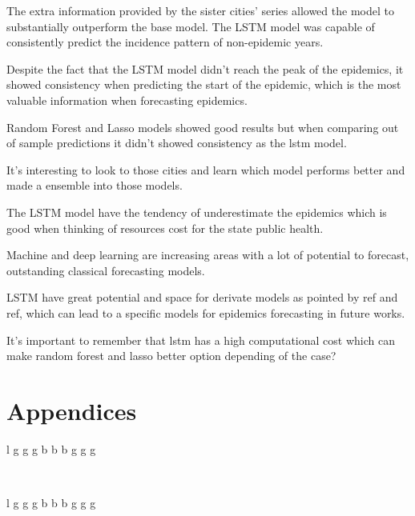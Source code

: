 \documentclass[12pt]{report}
\begin{document}
The extra information provided by the sister cities' series allowed the model to substantially outperform the base model. The LSTM model was capable of consistently predict the incidence pattern of non-epidemic years. 

Despite the fact that the LSTM model didn't reach the peak of the epidemics, it showed consistency when predicting the start of the epidemic, which is the most valuable information when forecasting epidemics.

Random Forest and Lasso models showed good results but when comparing out of sample predictions it didn't showed consistency as the lstm model.

It's interesting to look to those cities and learn which model performs better and made a ensemble into those models.

The LSTM model have the tendency of underestimate the epidemics which is good when thinking of resources cost for the state public health.

Machine and deep learning are increasing areas with a lot of potential to forecast, outstanding classical forecasting models.

LSTM have great potential and space for derivate models as pointed by ref and ref, which can lead to a specific models for epidemics forecasting in future works.

It's important to remember that lstm has a high computational cost which can make random forest and lasso better option depending of the case?



\newpage
{}
{}



\newpage
{}
{}
\chapter*{Appendices}

\scriptsize
\begin{center}
\begin{longtable}{l g g g b b b g g g}
\caption{Losses of Rio de Janeiro}\\

\label{tab:clusters_size} 
\end{longtable} 
\end{center} 
\normalsize


\scriptsize
\begin{center}
\begin{longtable}{l g g g b b b g g g}
\caption{Losses of Paraná}\\

\label{tab:clusters_size} 
\end{longtable} 
\end{center} 
\normalsize
\end{document}

